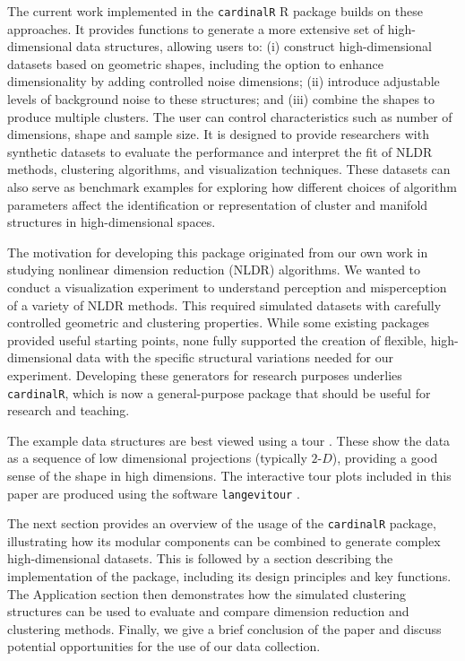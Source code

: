 The current work implemented in the \texttt{cardinalR} R package builds on these approaches. It provides functions to generate a more extensive set of high-dimensional data structures, allowing users to: (i) construct high-dimensional datasets based on geometric shapes, including the option to enhance dimensionality by adding controlled noise dimensions; (ii) introduce adjustable levels of background noise to these structures; and (iii) combine the shapes to produce multiple clusters. The user can control characteristics such as number of dimensions, shape and sample size. It is designed to provide researchers with synthetic datasets to evaluate the performance and interpret the fit of NLDR methods, clustering algorithms, and visualization techniques. These datasets can also serve as benchmark examples for exploring how different choices of algorithm parameters affect the identification or representation of cluster and manifold structures in high-dimensional spaces.

The motivation for developing this package originated from our own work in studying nonlinear dimension reduction (NLDR) algorithms. We wanted to conduct a visualization experiment to understand perception and misperception of a variety of NLDR methods. This required simulated datasets with carefully controlled geometric and clustering properties. While some existing packages provided useful starting points, none fully supported the creation of flexible, high-dimensional data with the specific structural variations needed for our experiment. Developing these generators for research purposes underlies \texttt{cardinalR}, which is now a general-purpose package that should be useful for research and teaching.

The example data structures are best viewed using a tour \citep{As85}. These show the data as a sequence of low dimensional projections (typically \(2\text{-}D\)), providing a good sense of the shape in high dimensions. The interactive tour plots included in this paper are produced using the software \texttt{langevitour} \citep{paul2023}.

The next section provides an overview of the usage of the \texttt{cardinalR} package, illustrating how its modular components can be combined to generate complex high-dimensional datasets. This is followed by a section describing the implementation of the package, including its design principles and key functions. The Application section then demonstrates how the simulated clustering structures can be used to evaluate and compare dimension reduction and clustering methods. Finally, we give a brief conclusion of the paper and discuss potential opportunities for the use of our data collection.

